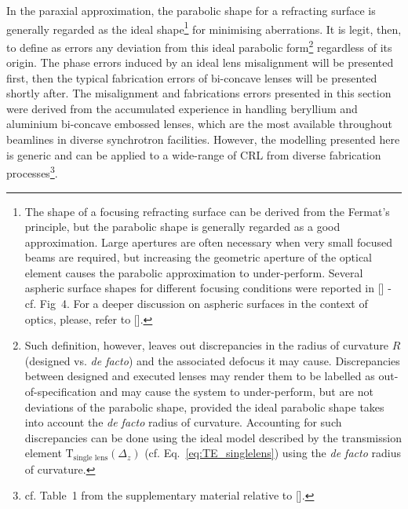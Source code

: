 \begin{refsection}
In the paraxial approximation, the parabolic shape for a refracting surface is generally regarded as the ideal shape\footnote{The shape of a focusing refracting surface can be derived from the Fermat's principle, but the parabolic shape is generally regarded as a good approximation. Large apertures are often necessary when very small focused beams are required, but increasing the geometric aperture of the optical element causes the parabolic approximation to under-perform. Several aspheric surface shapes for different focusing conditions were reported in [\cite{SanchezdelRio2012}] - cf. Fig~4. For a deeper discussion on aspheric surfaces in the context of optics, please, refer to [\cite{Schulz1988}].} for minimising aberrations. It is legit, then, to define as errors any deviation from this ideal parabolic form\footnote{Such definition, however, leaves out discrepancies in the radius of curvature $R$ (designed vs. \textit{de facto}) and the associated defocus it may cause. Discrepancies between designed and executed lenses may render them to be labelled as out-of-specification and may cause the system to under-perform, but are not deviations of the parabolic shape, provided the ideal parabolic shape takes into account the \textit{de facto} radius of curvature. Accounting for such discrepancies can be done using the ideal model described by the transmission element $\mathrm{T}_{\text{single lens}}(\Delta_z)$ (cf. Eq.~\ref{eq:TE_singlelens}) using the \textit{de facto} radius of curvature.} regardless of its origin. The phase errors induced by an ideal lens misalignment will be presented first, then the typical fabrication errors of bi-concave lenses will be presented shortly after. The misalignment and fabrications errors presented in this section were derived from the accumulated experience in handling beryllium and aluminium bi-concave embossed lenses, which are the most available throughout beamlines in diverse synchrotron facilities. However, the modelling presented here is generic and can be applied to a wide-range of CRL from diverse fabrication processes\footnote{cf. Table~1 from the supplementary material relative to [\cite{Roth2017}].}.


\end{refsection}
